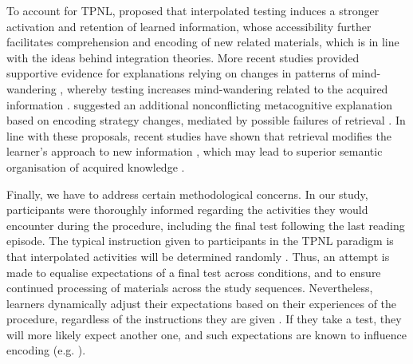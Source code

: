 \documentclass[../main.tex]{subfiles}
\begin{document}
To account for TPNL, \cite{wissmanInterimTestEffect2011} proposed that 
interpolated testing induces a stronger activation and retention of learned 
information, whose accessibility further facilitates comprehension and 
encoding of new related materials, which is in line with the ideas behind 
integration theories. More recent studies provided supportive evidence for 
explanations relying on changes in patterns of mind-wandering 
\citep{szpunarInterpolatedMemoryTests2013}, whereby testing increases 
mind-wandering related to the acquired information
\citep{jingInterpolatedTestingInfluences2016}. 
\cite{wissmanInterimTestEffect2011} suggested an additional nonconflicting 
metacognitive explanation based on encoding strategy changes, mediated by 
possible failures of retrieval 
\citep{bahrickImportanceRetrievalFailures2005}. In line with these 
proposals, recent studies have shown that retrieval modifies the learner's 
approach to new information \citep{choTestingEnhancesBoth2017, 
soderstromTestingFacilitatesRegulation2014}, which may lead to superior 
semantic organisation of acquired knowledge 
\citep{chanTestingPotentiatesNew2018, jingInterpolatedTestingInfluences2016}.

Finally, we have to address certain methodological concerns.  In our study, 
participants were thoroughly informed regarding the activities they would 
encounter during the procedure, including the final test following the last 
reading episode. The typical instruction given to participants in the TPNL 
paradigm is that interpolated activities will be determined randomly
\cite{yangEnhancingLearningRetrieval2018}. Thus, an attempt is made to 
equalise expectations of a final test across conditions, and to ensure 
continued processing of materials across the study sequences. Nevertheless, 
learners dynamically adjust their expectations based on their experiences of 
the procedure, regardless of the instructions they are given 
\citep{weinsteinRoleTestExpectancy2014}.  If they take a test, they will 
more likely expect another one, and such expectations are known to influence 
encoding (e.g. \citealp{szpunarExpectationFinalCumulative2007}). 
\end{document}
